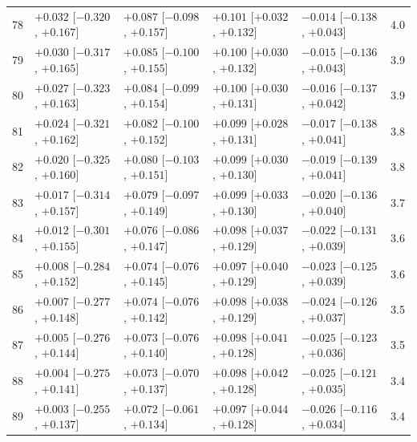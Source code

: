 \begin{longtable}{rllllr}
78 & $+0.032$ {\scriptsize [$-0.320$, $+0.167$]} & $+0.087$ {\scriptsize [$-0.098$, $+0.157$]} & $+0.101$ {\scriptsize [$+0.032$, $+0.132$]} & $-0.014$ {\scriptsize [$-0.138$, $+0.043$]} & 4.0 \\
79 & $+0.030$ {\scriptsize [$-0.317$, $+0.165$]} & $+0.085$ {\scriptsize [$-0.100$, $+0.155$]} & $+0.100$ {\scriptsize [$+0.030$, $+0.132$]} & $-0.015$ {\scriptsize [$-0.136$, $+0.043$]} & 3.9 \\
80 & $+0.027$ {\scriptsize [$-0.323$, $+0.163$]} & $+0.084$ {\scriptsize [$-0.099$, $+0.154$]} & $+0.100$ {\scriptsize [$+0.030$, $+0.131$]} & $-0.016$ {\scriptsize [$-0.137$, $+0.042$]} & 3.9 \\
81 & $+0.024$ {\scriptsize [$-0.321$, $+0.162$]} & $+0.082$ {\scriptsize [$-0.100$, $+0.152$]} & $+0.099$ {\scriptsize [$+0.028$, $+0.131$]} & $-0.017$ {\scriptsize [$-0.138$, $+0.041$]} & 3.8 \\
82 & $+0.020$ {\scriptsize [$-0.325$, $+0.160$]} & $+0.080$ {\scriptsize [$-0.103$, $+0.151$]} & $+0.099$ {\scriptsize [$+0.030$, $+0.130$]} & $-0.019$ {\scriptsize [$-0.139$, $+0.041$]} & 3.8 \\
83 & $+0.017$ {\scriptsize [$-0.314$, $+0.157$]} & $+0.079$ {\scriptsize [$-0.097$, $+0.149$]} & $+0.099$ {\scriptsize [$+0.033$, $+0.130$]} & $-0.020$ {\scriptsize [$-0.136$, $+0.040$]} & 3.7 \\
84 & $+0.012$ {\scriptsize [$-0.301$, $+0.155$]} & $+0.076$ {\scriptsize [$-0.086$, $+0.147$]} & $+0.098$ {\scriptsize [$+0.037$, $+0.129$]} & $-0.022$ {\scriptsize [$-0.131$, $+0.039$]} & 3.6 \\
85 & $+0.008$ {\scriptsize [$-0.284$, $+0.152$]} & $+0.074$ {\scriptsize [$-0.076$, $+0.145$]} & $+0.097$ {\scriptsize [$+0.040$, $+0.129$]} & $-0.023$ {\scriptsize [$-0.125$, $+0.039$]} & 3.6 \\
86 & $+0.007$ {\scriptsize [$-0.277$, $+0.148$]} & $+0.074$ {\scriptsize [$-0.076$, $+0.142$]} & $+0.098$ {\scriptsize [$+0.038$, $+0.129$]} & $-0.024$ {\scriptsize [$-0.126$, $+0.037$]} & 3.5 \\
87 & $+0.005$ {\scriptsize [$-0.276$, $+0.144$]} & $+0.073$ {\scriptsize [$-0.076$, $+0.140$]} & $+0.098$ {\scriptsize [$+0.041$, $+0.128$]} & $-0.025$ {\scriptsize [$-0.123$, $+0.036$]} & 3.5 \\
88 & $+0.004$ {\scriptsize [$-0.275$, $+0.141$]} & $+0.073$ {\scriptsize [$-0.070$, $+0.137$]} & $+0.098$ {\scriptsize [$+0.042$, $+0.128$]} & $-0.025$ {\scriptsize [$-0.121$, $+0.035$]} & 3.4 \\
89 & $+0.003$ {\scriptsize [$-0.255$, $+0.137$]} & $+0.072$ {\scriptsize [$-0.061$, $+0.134$]} & $+0.097$ {\scriptsize [$+0.044$, $+0.128$]} & $-0.026$ {\scriptsize [$-0.116$, $+0.034$]} & 3.4 \\

\end{longtable}

